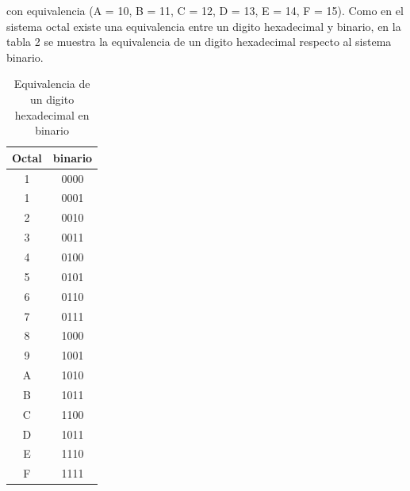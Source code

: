 \documentclass[12pt]{article}
\begin{document}
\begin{itemize}
					 con equivalencia (A = 10, B = 11, C = 12, D = 13, E = 14, F = 15). Como en el sistema octal 
					 existe una equivalencia entre un digito hexadecimal y binario, en la tabla 2 se muestra la 
					 equivalencia de un digito hexadecimal respecto al sistema binario.
					 \begin{table}[h!]
						\centering
						\begin{tabular}{|c|c|}
							\hline
							Octal & binario \\\hline
							1 & 0000 \\\hline
							1 & 0001 \\\hline
							2 & 0010 \\\hline
							3 & 0011 \\\hline
							4 & 0100 \\\hline
							5 & 0101 \\\hline
							6 & 0110 \\\hline
							7 & 0111 \\\hline
							8 & 1000 \\\hline
							9 & 1001 \\\hline
							A & 1010 \\\hline
							B & 1011 \\\hline
							C & 1100 \\\hline
							D & 1011 \\\hline
							E & 1110 \\\hline
							F & 1111 \\\hline
						\end{tabular}
						\caption{Equivalencia de un digito hexadecimal en binario}
						\label{tab:2}
					\end{table}
			\end{itemize}
\end{document}
